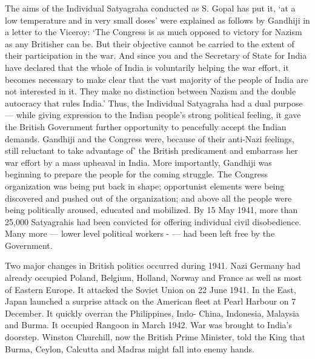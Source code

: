 The aims of the Individual Satyagraha conducted as S. Gopal has put it, `at a low temperature and in very small doses' were explained as follows by Gandhiji in a letter to the Viceroy: `The Congress is as much opposed to victory for Nazism as any Britisher can be. But their objective cannot be carried to the extent of their participation in the war. And since you and the Secretary of State for India have declared that the whole of India is voluntarily helping the war effort, it becomes necessary to make clear that the vast majority of the people of India are not interested in it. They make no distinction between Nazism and the double autocracy that rules India.' Thus, the Individual Satyagraha had a dual purpose --- while giving expression to the Indian people's strong political feeling, it gave the British Government further opportunity to peacefully accept the Indian demands. Gandhiji and the Congress were, because of their anti-Nazi feelings, still reluctant to take advantage of' the British predicament and embarrass her war effort by a mass upheaval in India. More importantly, Gandhiji was beginning to prepare the people for the coming struggle. The Congress organization was being put back in shape; opportunist elements were being discovered and pushed out of the organization; and above all the people were being politically aroused, educated and mobilized. By 15 May 1941, more than 25,000 Satyagrahis had been convicted for offering individual civil disobedience. Many more --- lower level political workers - --- had been left free by the Government. 

Two major changes in British politics occurred during 1941. Nazi Germany had already occupied Poland, Belgium, Holland, Norway and France as well as most of Eastern Europe. It attacked the Soviet Union on 22 June 1941. In the East, Japan launched a surprise attack on the American fleet at Pearl Harbour on 7 December. It quickly overran the Philippines, Indo- China, Indonesia, Malaysia and Burma. It occupied Rangoon in March 1942. War was brought to India's doorstep. Winston Churchill, now the British Prime Minister, told the King that Burma, Ceylon, Calcutta and Madras might fall into enemy hands. 

